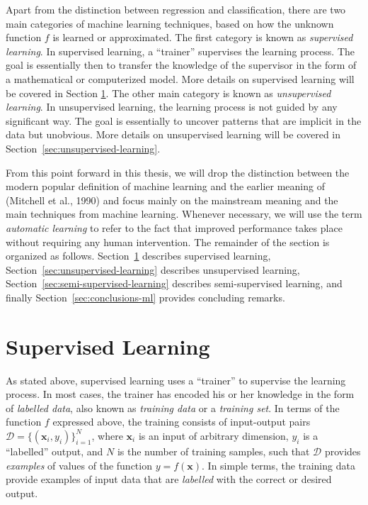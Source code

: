 Apart from the distinction between regression and classification, there are two main categories of machine learning techniques, based on how the unknown function $f$ is learned or approximated. The first category is known as \emph{supervised learning}. In supervised learning, a ``trainer'' supervises the learning process. The goal is essentially then to transfer the knowledge of the supervisor in the form of a mathematical or computerized model. More details on supervised learning will be covered in Section \ref{sec:supervised-learning}. The other main category is known as \emph{unsupervised learning}. In unsupervised learning, the learning process is not guided by any significant way. The goal is essentially to uncover patterns that are implicit in the data but unobvious.   More details on unsupervised learning will be covered in Section~\ref{sec:unsupervised-learning}.

From this point forward in this thesis, we will drop the distinction between the modern popular definition of machine learning and the earlier meaning of (Mitchell et al., 1990) and focus mainly on the mainstream meaning and the main techniques from machine learning. Whenever necessary, we will use the term \emph{automatic learning} to refer to the fact that improved performance takes place without requiring any human intervention. The remainder of the section is organized as follows. Section~\ref{sec:supervised-learning} describes supervised learning, Section~\ref{sec:unsupervised-learning} describes unsupervised learning, Section~\ref{sec:semi-supervised-learning} describes semi-supervised learning, and finally Section~\ref{sec:conclusions-ml} provides concluding remarks.
%
\section{Supervised Learning}
\label{sec:supervised-learning}
%
As stated above, supervised learning uses a ``trainer'' to supervise the learning process. In most cases, the trainer has encoded his or her knowledge in the form of \emph{labelled data}, also known as \emph{training data} or a \emph{training set}. In terms of the function $f$ expressed above, the training consists of input-output pairs $\mathcal{D} = \{(\mathbf{x}_i, y_i)\}_{i=1}^N $, where $\mathbf{x}_i$ is an input of arbitrary dimension, $y_i$ is a ``labelled'' output, and $N$ is the number of training samples, such that $\mathcal{D}$ provides \emph{examples} of values of the function $y = f(\mathbf{x})$. In simple terms, the training data provide examples of input data that are \emph{labelled} with the correct or desired output.

